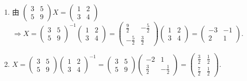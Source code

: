 	 \paragraph{} %
		 \begin{enumerate}
			 \item %
			       由 $\begin{pmatrix}
					       3 & 5 \\
					       5 & 9
				       \end{pmatrix} X = \begin{pmatrix}
					       1 & 2 \\
					       3 & 4
				       \end{pmatrix}$ $\Rightarrow X = \begin{pmatrix}
					       3 & 5 \\
					       5 & 9
				       \end{pmatrix}^{-1}
				       \begin{pmatrix}
					       1 & 2 \\
					       3 & 4
				       \end{pmatrix} = \begin{pmatrix}
					       \frac{9}{2}  & -\frac{5}{2} \\
					       -\frac{5}{2} & \frac{3}{2}
				       \end{pmatrix}
				       \begin{pmatrix}
					       1 & 2 \\
					       3 & 4
				       \end{pmatrix} = \begin{pmatrix}
					       -3 & -1 \\
					       2  & 1
				       \end{pmatrix}$.

			 \item %
			       $X = \begin{pmatrix}
					       3 & 5 \\
					       5 & 9
				       \end{pmatrix}
				       \begin{pmatrix}
					       1 & 2 \\
					       3 & 4
				       \end{pmatrix}^{-1} = \begin{pmatrix}
					       3 & 5 \\
					       5 & 9
				       \end{pmatrix}
				       \begin{pmatrix}
					       -2          & 1            \\
					       \frac{3}{2} & -\frac{1}{2}
				       \end{pmatrix} = \begin{pmatrix}
					       \frac{3}{2} & \frac{1}{2} \\
					       \frac{7}{2} & \frac{1}{2}
				       \end{pmatrix}$.


\end{enumerate}
